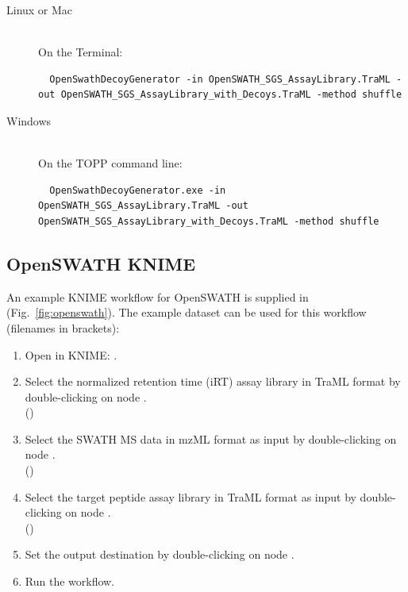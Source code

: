 \begin{description}
  \item[Linux or Mac] \hfill \\
    On the Terminal:
    \begin{lstlisting}
  OpenSwathDecoyGenerator -in OpenSWATH_SGS_AssayLibrary.TraML -out OpenSWATH_SGS_AssayLibrary_with_Decoys.TraML -method shuffle
  \end{lstlisting}
  \item[Windows] \hfill \\
    On the TOPP command line:
    \begin{lstlisting}
  OpenSwathDecoyGenerator.exe -in OpenSWATH_SGS_AssayLibrary.TraML -out OpenSWATH_SGS_AssayLibrary_with_Decoys.TraML -method shuffle
  \end{lstlisting}
\end{description}

\subsection{OpenSWATH KNIME}
An example KNIME workflow for OpenSWATH is supplied in  (Fig.~\ref{fig:openswath}). The example dataset can be used for this workflow (filenames in brackets):

\begin{enumerate}
  \item Open  in KNIME: .
  \item Select the normalized retention time (iRT) assay library in TraML format by double-clicking on node .\\
  ()
  \item Select the SWATH MS data in mzML format as input by double-clicking on node .\\
  ()
  \item Select the target peptide assay library in TraML format  as input by double-clicking on node .\\
  ()
  \item Set the output destination by double-clicking on node .\\
  \item Run the workflow.
\end{enumerate}


